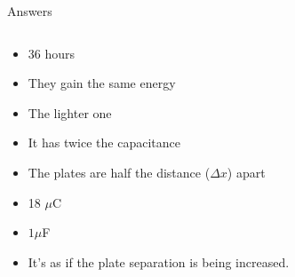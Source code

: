 \documentclass{beamer}
\begin{document}
\begin{frame}{Answers}
\begin{columns}[T]
\begin{column}{0.5\textwidth}
\begin{itemize}
\item 36 hours
\item They gain the same energy
\item The lighter one
\item It has twice the capacitance
\item The plates are half the distance ($\Delta x$) apart
\item 18 $\mu$C
\item $1\mu$F
\item It's as if the plate separation is being increased.
\end{itemize}
\end{column}
\end{columns}
\end{frame}
\end{document}
